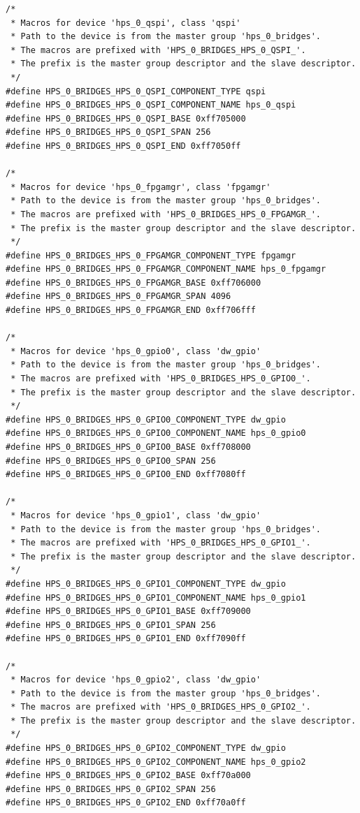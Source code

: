 \documentclass[conference]{IEEEtran}
\begin{document}
\begin{lstlisting}
/*
 * Macros for device 'hps_0_qspi', class 'qspi'
 * Path to the device is from the master group 'hps_0_bridges'.
 * The macros are prefixed with 'HPS_0_BRIDGES_HPS_0_QSPI_'.
 * The prefix is the master group descriptor and the slave descriptor.
 */
#define HPS_0_BRIDGES_HPS_0_QSPI_COMPONENT_TYPE qspi
#define HPS_0_BRIDGES_HPS_0_QSPI_COMPONENT_NAME hps_0_qspi
#define HPS_0_BRIDGES_HPS_0_QSPI_BASE 0xff705000
#define HPS_0_BRIDGES_HPS_0_QSPI_SPAN 256
#define HPS_0_BRIDGES_HPS_0_QSPI_END 0xff7050ff

/*
 * Macros for device 'hps_0_fpgamgr', class 'fpgamgr'
 * Path to the device is from the master group 'hps_0_bridges'.
 * The macros are prefixed with 'HPS_0_BRIDGES_HPS_0_FPGAMGR_'.
 * The prefix is the master group descriptor and the slave descriptor.
 */
#define HPS_0_BRIDGES_HPS_0_FPGAMGR_COMPONENT_TYPE fpgamgr
#define HPS_0_BRIDGES_HPS_0_FPGAMGR_COMPONENT_NAME hps_0_fpgamgr
#define HPS_0_BRIDGES_HPS_0_FPGAMGR_BASE 0xff706000
#define HPS_0_BRIDGES_HPS_0_FPGAMGR_SPAN 4096
#define HPS_0_BRIDGES_HPS_0_FPGAMGR_END 0xff706fff

/*
 * Macros for device 'hps_0_gpio0', class 'dw_gpio'
 * Path to the device is from the master group 'hps_0_bridges'.
 * The macros are prefixed with 'HPS_0_BRIDGES_HPS_0_GPIO0_'.
 * The prefix is the master group descriptor and the slave descriptor.
 */
#define HPS_0_BRIDGES_HPS_0_GPIO0_COMPONENT_TYPE dw_gpio
#define HPS_0_BRIDGES_HPS_0_GPIO0_COMPONENT_NAME hps_0_gpio0
#define HPS_0_BRIDGES_HPS_0_GPIO0_BASE 0xff708000
#define HPS_0_BRIDGES_HPS_0_GPIO0_SPAN 256
#define HPS_0_BRIDGES_HPS_0_GPIO0_END 0xff7080ff

/*
 * Macros for device 'hps_0_gpio1', class 'dw_gpio'
 * Path to the device is from the master group 'hps_0_bridges'.
 * The macros are prefixed with 'HPS_0_BRIDGES_HPS_0_GPIO1_'.
 * The prefix is the master group descriptor and the slave descriptor.
 */
#define HPS_0_BRIDGES_HPS_0_GPIO1_COMPONENT_TYPE dw_gpio
#define HPS_0_BRIDGES_HPS_0_GPIO1_COMPONENT_NAME hps_0_gpio1
#define HPS_0_BRIDGES_HPS_0_GPIO1_BASE 0xff709000
#define HPS_0_BRIDGES_HPS_0_GPIO1_SPAN 256
#define HPS_0_BRIDGES_HPS_0_GPIO1_END 0xff7090ff

/*
 * Macros for device 'hps_0_gpio2', class 'dw_gpio'
 * Path to the device is from the master group 'hps_0_bridges'.
 * The macros are prefixed with 'HPS_0_BRIDGES_HPS_0_GPIO2_'.
 * The prefix is the master group descriptor and the slave descriptor.
 */
#define HPS_0_BRIDGES_HPS_0_GPIO2_COMPONENT_TYPE dw_gpio
#define HPS_0_BRIDGES_HPS_0_GPIO2_COMPONENT_NAME hps_0_gpio2
#define HPS_0_BRIDGES_HPS_0_GPIO2_BASE 0xff70a000
#define HPS_0_BRIDGES_HPS_0_GPIO2_SPAN 256
#define HPS_0_BRIDGES_HPS_0_GPIO2_END 0xff70a0ff


\end{lstlisting}
\end{document}
